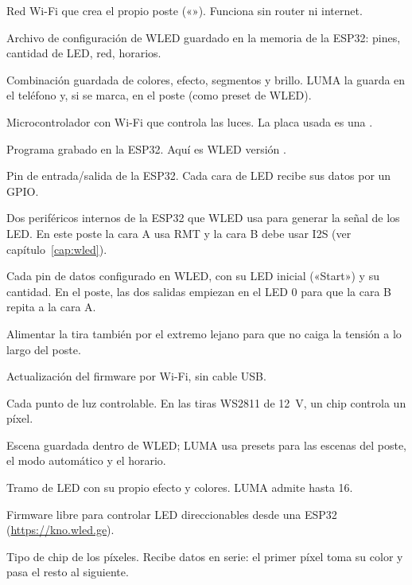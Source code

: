 \begin{description}[leftmargin=0pt, itemsep=0.3em]
\item[AP (punto de acceso)] Red Wi-Fi que crea el propio poste («»). Funciona sin router ni internet.
\item[cfg.json] Archivo de configuración de WLED guardado en la memoria de la ESP32: pines, cantidad de LED, red, horarios.
\item[Escena] Combinación guardada de colores, efecto, segmentos y brillo. LUMA la guarda en el teléfono y, si se marca, en el poste (como preset de WLED).
\item[ESP32-S3] Microcontrolador con Wi-Fi que controla las luces. La placa usada es una .
\item[Firmware] Programa grabado en la ESP32. Aquí es WLED versión .
\item[GPIO] Pin de entrada/salida de la ESP32. Cada cara de LED recibe sus datos por un GPIO.
\item[I2S y RMT] Dos periféricos internos de la ESP32 que WLED usa para generar la señal de los LED. En este poste la cara A usa RMT y la cara B debe usar I2S (ver capítulo~\ref{cap:wled}).
\item[Salida de LED] Cada pin de datos configurado en WLED, con su LED inicial («Start») y su cantidad. En el poste, las dos salidas empiezan en el LED 0 para que la cara B repita a la cara A.
\item[Inyección] Alimentar la tira también por el extremo lejano para que no caiga la tensión a lo largo del poste.
\item[OTA] Actualización del firmware por Wi-Fi, sin cable USB.
\item[Píxel] Cada punto de luz controlable. En las tiras WS2811 de 12~V, un chip controla un píxel.
\item[Preset] Escena guardada dentro de WLED; LUMA usa presets para las escenas del poste, el modo automático y el horario.
\item[Segmento] Tramo de LED con su propio efecto y colores. LUMA admite hasta 16.
\item[WLED] Firmware libre para controlar LED direccionables desde una ESP32 (\url{https://kno.wled.ge}).
\item[WS2811] Tipo de chip de los píxeles. Recibe datos en serie: el primer píxel toma su color y pasa el resto al siguiente.
\end{description}
